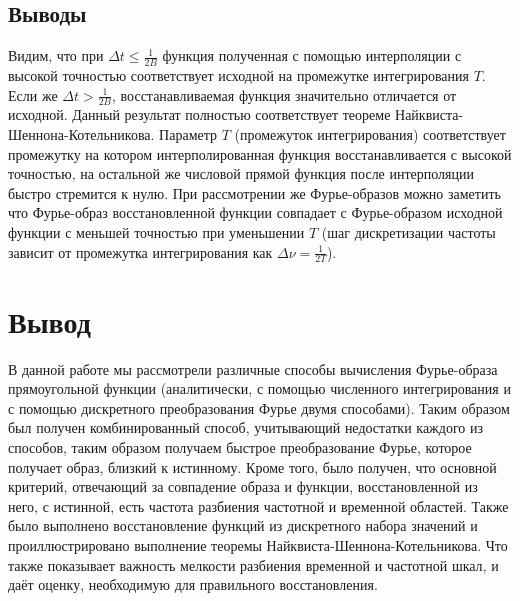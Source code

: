 \documentclass[a4paper, 12pt]{article}
\begin{document}
\subsection{Выводы}
Видим, что при $\Delta t \leq \frac{1}{2B}$ функция полученная с помощью интерполяции с высокой точностью соответствует исходной на промежутке интегрирования $T$. Если же $\Delta t > \frac{1}{2B}$, восстанавливаемая функция значительно отличается от исходной. Данный результат полностью соответствует теореме Найквиста-Шеннона-Котельникова.
\newline
Параметр $T$ (промежуток интегрирования) соответствует промежутку на котором интерполированная функция восстанавливается с высокой точностью, на остальной же числовой прямой функция после интерполяции быстро стремится к нулю.
\newline
При рассмотрении же Фурье-образов можно заметить что Фурье-образ восстановленной функции совпадает с Фурье-образом исходной функции с меньшей точностью при уменьшении $T$ (шаг дискретизации частоты зависит от промежутка интегрирования как $\Delta \nu = \frac{1}{2T}$).
\newpage


\section{Вывод}
В данной работе мы рассмотрели различные способы вычисления Фурье-образа прямоугольной функции (аналитически, с помощью численного интегрирования и с помощью дискретного преобразования Фурье двумя способами). Таким образом был получен комбинированный способ, учитывающий недостатки каждого из способов, таким образом получаем быстрое преобразование Фурье, которое получает образ, близкий к истинному.
Кроме того, было получен, что основной критерий, отвечающий за совпадение образа и функции, восстановленной из него, с истинной, есть частота разбиения частотной и временной областей.
\newline
Также было выполнено восстановление функций из дискретного набора значений и проиллюстрировано выполнение теоремы Найквиста-Шеннона-Котельникова. Что также показывает важность мелкости разбиения временной и частотной шкал, и даёт оценку, необходимую для правильного восстановления.

\newpage
\end{document}
